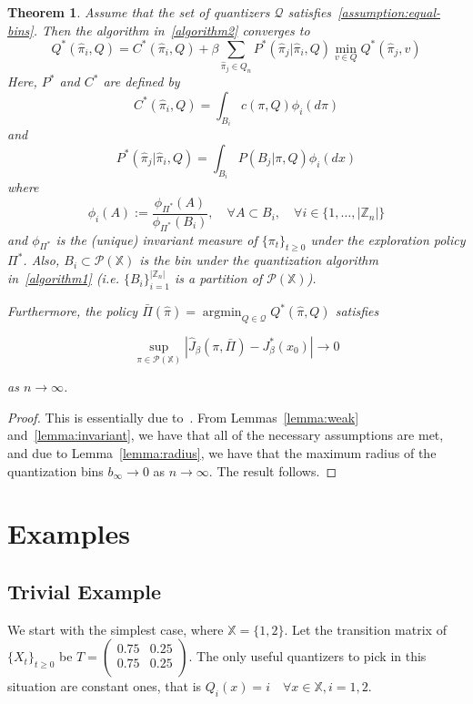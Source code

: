 \documentclass{article}
\newtheorem{theorem}{Theorem}[section]
\DeclareMathOperator*{\argmin}{argmin}
\begin{document}
\begin{theorem}
    Assume that the set of quantizers \( \mathcal{Q} \) satisfies~\ref{assumption:equal-bins}. Then the algorithm in~\ref{algorithm2} converges to
    \[ Q^*(\hat{\pi}_i, Q) = C^*(\hat{\pi}_i, Q) + \beta \sum_{\hat{\pi}_j \in Q_n}P^*(\hat{\pi}_j|\hat{\pi}_i,Q)\min_{v \in Q}Q^*(\hat{\pi}_j, v) \]
    Here, \(P^*\) and \(C^*\) are defined by
    \[ C^*(\hat{\pi}_i, Q) = \int_{B_i}c(\pi,Q)\phi_i(d \pi)\]
    and
    \[ P^*(\hat{\pi}_j|\hat{\pi}_i,Q) = \int_{B_i}P(B_j|\pi,Q)\phi_i(dx) \]
    where
    \[ \phi_i(A) := \frac{\phi_{\Pi^*}(A)}{\phi_{\Pi^*}(B_i)},\quad \forall A \subset B_i, \quad \forall i \in \{ 1,\ldots,|\mathbb{Z}_n| \} \]
    and \( \phi_{\Pi^*} \) is the (unique) invariant measure of \( \{\pi_t\}_{t\ge0} \) under the exploration policy \( \Pi^* \). %
    Also, \( B_i \subset \mathcal{P}(\mathbb{X}) \) is the bin under the quantization algorithm in~\ref{algorithm1} (i.e. \( \{B_i\}_{i=1}^{|\mathbb{Z}_n|} \) is a partition of \( \mathcal{P}(\mathbb{X}) \)). %

    Furthermore, the policy \( \bar{\Pi}(\hat{\pi}) = \argmin_{Q \in \mathcal{Q}} Q^*(\hat{\pi},Q) \) satisfies

    \[ \sup_{\pi \in \mathcal{P}(\mathbb{X})}|\hat{J}_{\beta}(\pi, \bar{\Pi}) - J_{\beta}^*(x_0)| \to 0 \]

    as \( n \to \infty \).
\end{theorem}

\begin{proof}
    This is essentially due to~\cite[Theorem 3.2 and Corollary 3.3]{Kara}. From Lemmas~\ref{lemma:weak} and~\ref{lemma:invariant}, we have that all of the necessary assumptions are met, and due to Lemma~\ref{lemma:radius}, we have that the maximum radius of the quantization bins \( b_{\infty} \to 0 \) as \( n \to \infty \). The result follows.
\end{proof}

\section{Examples}
\subsection{Trivial Example}
We start with the simplest case, where \( \mathbb{X} = \{1, 2\} \). Let the transition matrix of \( \{ X_t \}_{t\ge0} \) be \( T = \begin{pmatrix} 0.75 & 0.25 \\ 0.75 & 0.25 \\ \end{pmatrix} \). The only useful quantizers to pick in this situation are constant ones, that is \( Q_i(x) = i \quad \forall x\in\mathbb{X}, i=1,2 \). %
\end{document}
